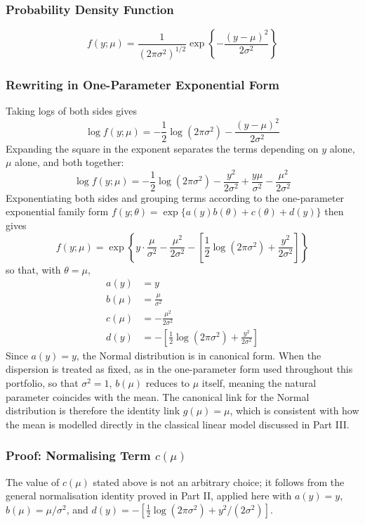 \documentclass[12pt,a4paper]{report}
\begin{document}
\subsubsection*{Probability Density Function}

\[
f(y;\mu) = \frac{1}{(2\pi\sigma^2)^{1/2}}\exp\left\{-\frac{(y-\mu)^2}{2\sigma^2}\right\}
\]

\subsubsection*{Rewriting in One-Parameter Exponential Form}

Taking logs of both sides gives
\[
\log f(y;\mu) = -\frac{1}{2}\log(2\pi\sigma^2) - \frac{(y-\mu)^2}{2\sigma^2}
\]
Expanding the square in the exponent separates the terms depending on $y$ alone, $\mu$ alone, and both together:
\[
\log f(y;\mu) = -\frac{1}{2}\log(2\pi\sigma^2) - \frac{y^2}{2\sigma^2} + \frac{y\mu}{\sigma^2} - \frac{\mu^2}{2\sigma^2}
\]
Exponentiating both sides and grouping terms according to the one-parameter exponential family form $f(y;\theta) = \exp\{a(y)b(\theta) + c(\theta) + d(y)\}$ then gives
\[
f(y;\mu) = \exp\left\{y\cdot\frac{\mu}{\sigma^2} - \frac{\mu^2}{2\sigma^2} - \left[\frac{1}{2}\log(2\pi\sigma^2) + \frac{y^2}{2\sigma^2}\right]\right\}
\]
so that, with $\theta = \mu$,
\begin{align*}
a(y) &= y \\[4pt]
b(\mu) &= \frac{\mu}{\sigma^2} \\[4pt]
c(\mu) &= -\frac{\mu^2}{2\sigma^2} \\[4pt]
d(y) &= -\left[\frac{1}{2}\log(2\pi\sigma^2) + \frac{y^2}{2\sigma^2}\right]
\end{align*}
Since $a(y) = y$, the Normal distribution is in canonical form. When the dispersion is treated as fixed, as in the one-parameter form used throughout this portfolio, so that $\sigma^2 = 1$, $b(\mu)$ reduces to $\mu$ itself, meaning the natural parameter coincides with the mean. The canonical link for the Normal distribution is therefore the identity link $g(\mu) = \mu$, which is consistent with how the mean is modelled directly in the classical linear model discussed in Part III.

\subsubsection*{Proof: Normalising Term $c(\mu)$}

The value of $c(\mu)$ stated above is not an arbitrary choice; it follows from the general normalisation identity proved in Part II, applied here with $a(y) = y$, $b(\mu) = \mu/\sigma^2$, and $d(y) = -\left[\tfrac{1}{2}\log(2\pi\sigma^2) + y^2/(2\sigma^2)\right]$.
\end{document}
